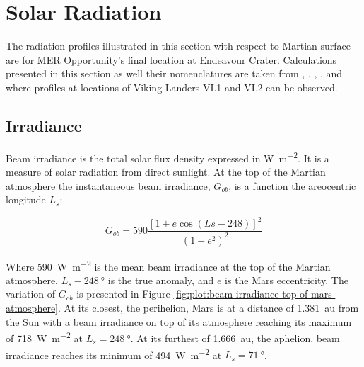 \section{Solar Radiation}
\label{sec:MartianEnvironment:SolarRadiation}


The radiation profiles illustrated in this section with respect to Martian surface are for MER Opportunity's final location at Endeavour Crater. Calculations presented in this section as well their nomenclatures are taken from , , , , and  where profiles at locations of Viking Landers VL1 and VL2 can be observed.

\subsection{Irradiance}
\label{sec:MartianEnvironment:SolarRadiation:Irradiance}

Beam irradiance is the total solar flux density expressed in \si{\watt\per\meter\squared}. It is a measure of solar radiation from direct sunlight. At the top of the Martian atmosphere the instantaneous beam irradiance, $G_{ob}$, is a function the areocentric longitude $L_{s}$:

\begin{equation}
  \label{eq:G_ob}
  G_{ob} = 590 \frac{[1 + e \cos{(Ls - 248)}]^2}{(1-e^2)^2}
\end{equation}

Where \SI{590}{\watt\per\meter\squared} is the mean beam irradiance at the top of the Martian atmosphere, $L_{s} - \SI{248}{\degree}$ is the true anomaly, and $e$ is the Mars eccentricity. The variation of $G_{ob}$ is presented in Figure \ref{fig:plot:beam-irradiance-top-of-mars-atmosphere}. At its closest, the perihelion, Mars is at a distance of \SI{1.381}{\astronomicalunit} from the Sun with a beam irradiance on top of its atmosphere reaching its maximum of \SI{718}{\watt\per\meter\squared} at $L_{s} = \SI{248}{\degree}$. At its furthest of \SI{1.666}{\astronomicalunit}, the aphelion, beam irradiance reaches its minimum of \SI{494}{\watt\per\meter\squared} at $L_{s} = \SI{71}{\degree}$.


